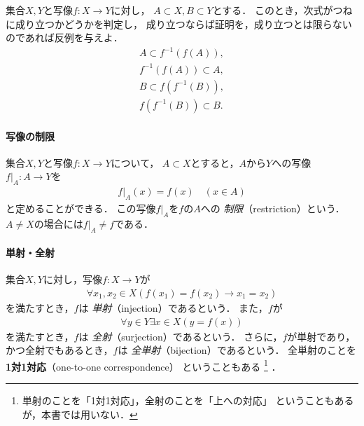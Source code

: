     \begin{que} \label{que:mapsubset}
      集合$X,  Y$と写像$f: X \longrightarrow Y$に対し，
      $A \subset X,  B \subset Y$とする．
      このとき，次式がつねに成り立つかどうかを判定し，
      成り立つならば証明を，成り立つとは限らないのであれば反例を与えよ．
      \begin{align}
        A \subset f^{-1} ( f(A)),
        \label{eq:AfinfA} \\
        f^{-1}(f(A)) \subset A,
        \label{eq:finfAA} \\
        B \subset f(f^{-1}(B)),
        \label{eq:BffinB} \\
        f(f^{-1}(B)) \subset B.
        \label{eq:ffinBB}
      \end{align}
    \end{que}

   \paragraph{写像の制限}
    集合$X,  Y$と写像$f: X \longrightarrow Y$について，
    $A \subset X$とすると，$A$から$Y$への写像
    $f |_A : A \longrightarrow Y$を
    \begin{align}
      f|_A (x) = f(x) \quad ( x \in A)
      \label{eq:maprestriction}
    \end{align}
    と定めることができる．
    この写像$f|_A$を$f$の$A$への
    \emph{制限}（restriction）という．
    $A \neq X$の場合には$f|_A \neq f$である．
   

   \paragraph{単射・全射}
    集合$X ,  Y$に対し，写像$f: X \longrightarrow Y$が
    \begin{align}
      \forall x_1, x_2 \in X( f(x_1) = f(x_2) \to x_1 = x_2)
      \label{eq:injection}
    \end{align}
    を満たすとき，$f$は
    \emph{単射}（injection）であるという．
    また，$f$が
    \begin{align}
      \forall y \in Y \exists x \in X( y = f(x))
      \label{eq:surjection}
    \end{align}
    を満たすとき，$f$は
    \emph{全射}（surjection）であるという．
    さらに，$f$が単射であり，かつ全射でもあるとき，$f$は
    \emph{全単射}（bijection）であるという．
    全単射のことを
    \textbf{1対1対応}（one-to-one correspondence）
    ということもある
    \footnote{単射のことを「1対1対応」，全射のことを「上への対応」
              ということもあるが，本書では用いない．}
    ．
   
